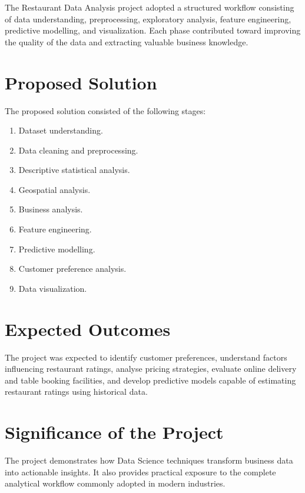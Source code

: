 \documentclass[12pt,a4paper]{report}
\begin{document}
The Restaurant Data Analysis project adopted a structured workflow consisting of data understanding, preprocessing, exploratory analysis, feature engineering, predictive modelling, and visualization. Each phase contributed toward improving the quality of the data and extracting valuable business knowledge.

\section{Proposed Solution}

The proposed solution consisted of the following stages:

\begin{enumerate}
\item Dataset understanding.
\item Data cleaning and preprocessing.
\item Descriptive statistical analysis.
\item Geospatial analysis.
\item Business analysis.
\item Feature engineering.
\item Predictive modelling.
\item Customer preference analysis.
\item Data visualization.
\end{enumerate}

\section{Expected Outcomes}

The project was expected to identify customer preferences, understand factors influencing restaurant ratings, analyse pricing strategies, evaluate online delivery and table booking facilities, and develop predictive models capable of estimating restaurant ratings using historical data.

\section{Significance of the Project}

The project demonstrates how Data Science techniques transform business data into actionable insights. It also provides practical exposure to the complete analytical workflow commonly adopted in modern industries.

\end{document}
